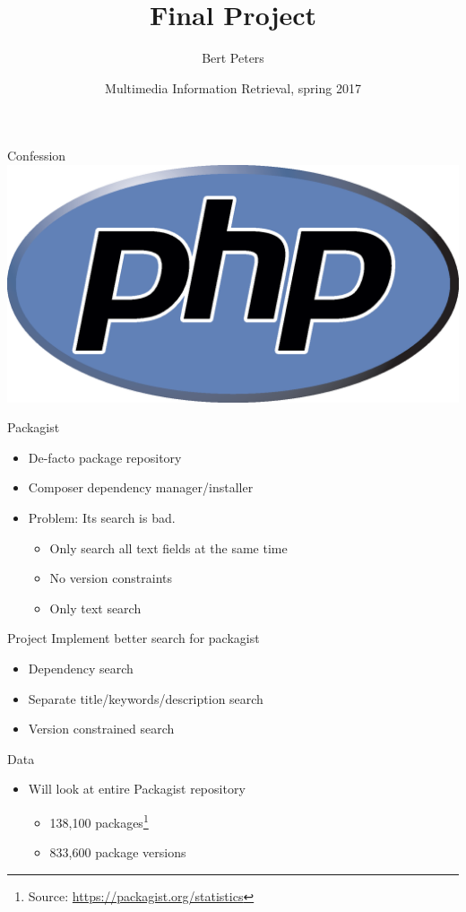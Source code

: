 \documentclass{beamer}
\title{Final Project}
\author{Bert Peters}
\institute{Leiden Institute for Advanced Computer Science}
\date{Multimedia Information Retrieval, spring 2017}
\begin{document}
\begin{frame}
	\titlepage
\end{frame}

\begin{frame}{Confession}
	\centering
	\pause
	\includegraphics[width=\textwidth]{php-logo}
\end{frame}

\begin{frame}{Packagist}
	\begin{itemize}
		\item De-facto package repository
		\item Composer dependency manager/installer
			\pause
		\item Problem: Its search is bad.
			\pause
			\begin{itemize}
				\item Only search all text fields at the same time
				\item No version constraints
				\item Only text search
			\end{itemize}
	\end{itemize}
\end{frame}

\begin{frame}{Project}
	Implement better search for packagist
	\begin{itemize}
		\item Dependency search
		\item Separate title/keywords/description search
		\item Version constrained search
	\end{itemize}
\end{frame}

\begin{frame}{Data}
	\begin{itemize}
		\item Will look at entire Packagist repository
			\begin{itemize}
				\item 138,100 packages\footnote{Source: \url{https://packagist.org/statistics}}
				\item 833,600 package versions
			\end{itemize}
	\end{itemize}
\end{frame}
\end{document}

